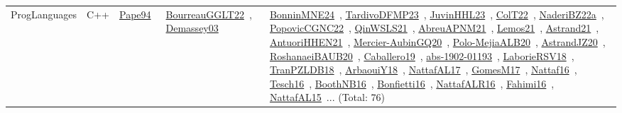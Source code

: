 {\begin{longtable}{lp{3cm}>{\raggedright\arraybackslash}p{6cm}>{\raggedright\arraybackslash}p{6cm}>{\raggedright\arraybackslash}p{8cm}}
ProgLanguages & C++ & \href{../works/Pape94.pdf}{Pape94}~\cite{Pape94} & \href{../works/BourreauGGLT22.pdf}{BourreauGGLT22}~\cite{BourreauGGLT22}, \href{../works/Demassey03.pdf}{Demassey03}~\cite{Demassey03} & \href{../works/BonninMNE24.pdf}{BonninMNE24}~\cite{BonninMNE24}, \href{../works/TardivoDFMP23.pdf}{TardivoDFMP23}~\cite{TardivoDFMP23}, \href{../works/JuvinHHL23.pdf}{JuvinHHL23}~\cite{JuvinHHL23}, \href{../works/ColT22.pdf}{ColT22}~\cite{ColT22}, \href{../works/NaderiBZ22a.pdf}{NaderiBZ22a}~\cite{NaderiBZ22a}, \href{../works/PopovicCGNC22.pdf}{PopovicCGNC22}~\cite{PopovicCGNC22}, \href{../works/QinWSLS21.pdf}{QinWSLS21}~\cite{QinWSLS21}, \href{../works/AbreuAPNM21.pdf}{AbreuAPNM21}~\cite{AbreuAPNM21}, \href{../works/Lemos21.pdf}{Lemos21}~\cite{Lemos21}, \href{../works/Astrand21.pdf}{Astrand21}~\cite{Astrand21}, \href{../works/AntuoriHHEN21.pdf}{AntuoriHHEN21}~\cite{AntuoriHHEN21}, \href{../works/Mercier-AubinGQ20.pdf}{Mercier-AubinGQ20}~\cite{Mercier-AubinGQ20}, \href{../works/Polo-MejiaALB20.pdf}{Polo-MejiaALB20}~\cite{Polo-MejiaALB20}, \href{../works/AstrandJZ20.pdf}{AstrandJZ20}~\cite{AstrandJZ20}, \href{../works/RoshanaeiBAUB20.pdf}{RoshanaeiBAUB20}~\cite{RoshanaeiBAUB20}, \href{../works/Caballero19.pdf}{Caballero19}~\cite{Caballero19}, \href{../works/abs-1902-01193.pdf}{abs-1902-01193}~\cite{abs-1902-01193}, \href{../works/LaborieRSV18.pdf}{LaborieRSV18}~\cite{LaborieRSV18}, \href{../works/TranPZLDB18.pdf}{TranPZLDB18}~\cite{TranPZLDB18}, \href{../works/ArbaouiY18.pdf}{ArbaouiY18}~\cite{ArbaouiY18}, \href{../works/NattafAL17.pdf}{NattafAL17}~\cite{NattafAL17}, \href{../works/GomesM17.pdf}{GomesM17}~\cite{GomesM17}, \href{../works/Nattaf16.pdf}{Nattaf16}~\cite{Nattaf16}, \href{../works/Tesch16.pdf}{Tesch16}~\cite{Tesch16}, \href{../works/BoothNB16.pdf}{BoothNB16}~\cite{BoothNB16}, \href{../works/Bonfietti16.pdf}{Bonfietti16}~\cite{Bonfietti16}, \href{../works/NattafALR16.pdf}{NattafALR16}~\cite{NattafALR16}, \href{../works/Fahimi16.pdf}{Fahimi16}~\cite{Fahimi16}, \href{../works/NattafAL15.pdf}{NattafAL15}~\cite{NattafAL15}... (Total: 76)\\

\end{longtable}}
